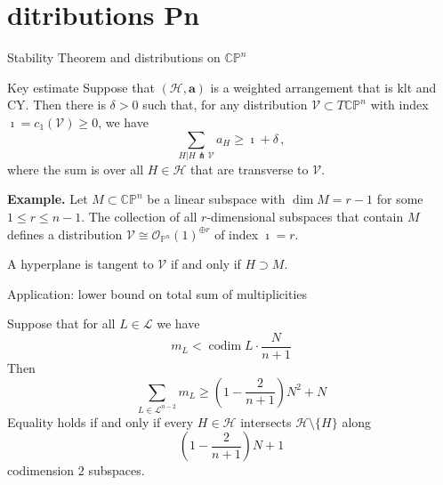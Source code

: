 \documentclass{beamer}
\renewcommand{\P}{\mathbb{P}}
\newcommand{\CP}{\mathbb{CP}}
\newcommand{\mO}{\mathcal{O}}
\newcommand{\mH}{\mathcal{H}}
\newcommand{\mL}{\mathcal{L}}
\newcommand{\mV}{\mathcal{V}}
\newcommand{\ba}{\mathbf{a}}
\DeclareMathOperator{\codim}{codim}
\begin{document}
\section{ditributions Pn}
\begin{frame}{Stability Theorem and distributions on \(\CP^n\)}
	\begin{block}{Key estimate}
		Suppose that \((\mH, \ba)\) is a weighted arrangement that is  klt and CY.
		Then there is \(\delta>0\) such that, for any distribution \(\mV \subset T\CP^n\) with index \(\imath = c_1(\mV) \geq 0\), we have
		\begin{equation*}
		\sum_{H  | H \pitchfork \mV} a_H \geq \imath + \delta  \,,
		\end{equation*}
		where the sum is over all \(H \in \mH\) that are transverse to \(\mV\).
	\end{block}

\textbf{Example.}
Let \(M \subset \CP^n\) be a linear subspace with \(\dim M = r-1\) for some \(1 \leq r \leq n-1\). The collection of all \(r\)-dimensional subspaces that contain \(M\) defines a distribution \(\mV \cong \mO_{\P^n}(1)^{\oplus r}\) of index \(\imath = r\). 

A hyperplane is tangent to \(\mV\) if and only if \(H \supset M\). 
\end{frame}

\begin{frame}{Application: lower bound on total sum of multiplicities}
	\begin{theorem}[dB-Panov, 2024]\label{thm:hir}
		Suppose that for all \(L \in \mL\) we have
		\begin{equation*}
		m_L < \codim L \cdot \frac{N}{n+1} 
		\end{equation*}
		Then
		\begin{equation*}
		\sum_{L \in \mL^{n-2}} m_L \geq \left( 1 - \frac{2}{n+1} \right) N^2 + N
		\end{equation*}
		Equality holds if and only if every \(H \in \mH\) intersects \(\mH \setminus \{H\}\) along
		\begin{equation*}
		\left( 1 - \frac{2}{n+1} \right) N + 1	
		\end{equation*}
		codimension \(2\) subspaces.
	\end{theorem}
\end{frame}
\end{document}
